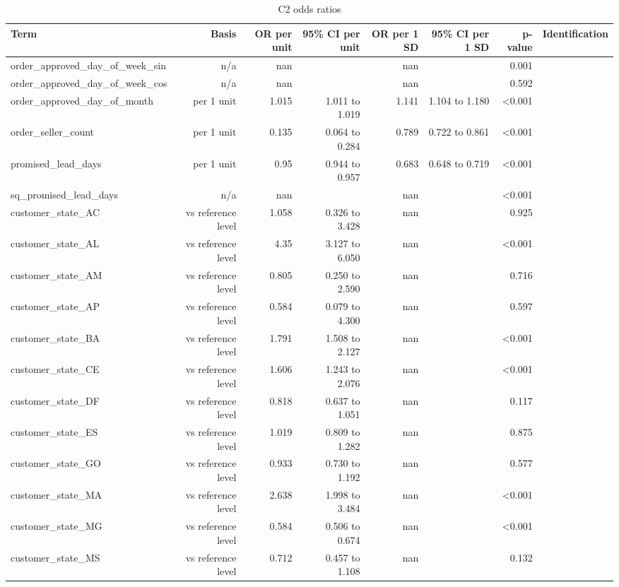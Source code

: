 \begin{table}[htbp]
\centering
\small
\caption{C2 odds ratios}
\begin{tabular}{lrrrrrrr}
\toprule
Term & Basis & OR per unit & 95\% CI per unit & OR per 1 SD & 95\% CI per 1 SD & p-value & Identification \\
\midrule
order\_approved\_day\_of\_week\_sin & n/a & nan &  & nan &  & 0.001 &  \\
order\_approved\_day\_of\_week\_cos & n/a & nan &  & nan &  & 0.592 &  \\
order\_approved\_day\_of\_month & per 1 unit & 1.015 & 1.011 to 1.019 & 1.141 & 1.104 to 1.180 & <0.001 &  \\
order\_seller\_count & per 1 unit & 0.135 & 0.064 to 0.284 & 0.789 & 0.722 to 0.861 & <0.001 &  \\
promised\_lead\_days & per 1 unit & 0.95 & 0.944 to 0.957 & 0.683 & 0.648 to 0.719 & <0.001 &  \\
sq\_promised\_lead\_days & n/a & nan &  & nan &  & <0.001 &  \\
customer\_state\_AC & vs reference level & 1.058 & 0.326 to 3.428 & nan &  & 0.925 &  \\
customer\_state\_AL & vs reference level & 4.35 & 3.127 to 6.050 & nan &  & <0.001 &  \\
customer\_state\_AM & vs reference level & 0.805 & 0.250 to 2.590 & nan &  & 0.716 &  \\
customer\_state\_AP & vs reference level & 0.584 & 0.079 to 4.300 & nan &  & 0.597 &  \\
customer\_state\_BA & vs reference level & 1.791 & 1.508 to 2.127 & nan &  & <0.001 &  \\
customer\_state\_CE & vs reference level & 1.606 & 1.243 to 2.076 & nan &  & <0.001 &  \\
customer\_state\_DF & vs reference level & 0.818 & 0.637 to 1.051 & nan &  & 0.117 &  \\
customer\_state\_ES & vs reference level & 1.019 & 0.809 to 1.282 & nan &  & 0.875 &  \\
customer\_state\_GO & vs reference level & 0.933 & 0.730 to 1.192 & nan &  & 0.577 &  \\
customer\_state\_MA & vs reference level & 2.638 & 1.998 to 3.484 & nan &  & <0.001 &  \\
customer\_state\_MG & vs reference level & 0.584 & 0.506 to 0.674 & nan &  & <0.001 &  \\
customer\_state\_MS & vs reference level & 0.712 & 0.457 to 1.108 & nan &  & 0.132 &  \\

\end{tabular}
\end{table}
